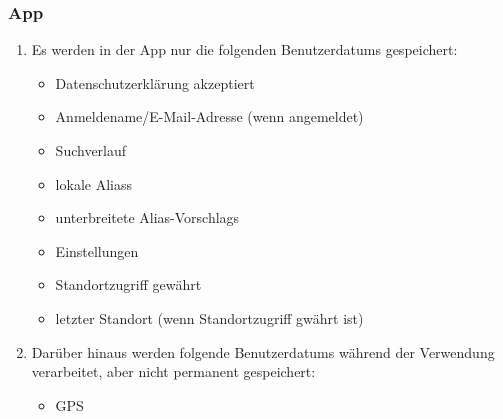 \subsubsection*{App}

\begin{samepage}
    \begin{enumerate}[label=\textbf{/NFD\arabic*0/}, align=left]
        \item Es werden in der App nur die folgenden \Glspl{Benutzerdatum} gespeichert:
            \begin{itemize}
                \item Datenschutzerklärung akzeptiert
                \item Anmeldename/E-Mail-Adresse (wenn angemeldet)
                \item Suchverlauf
                \item \gls{lokal}e \Glspl{Alias}
                \item unterbreitete \Glspl{Alias-Vorschlag}
                \item Einstellungen
                \item Standortzugriff gewährt
                \item letzter Standort (wenn Standortzugriff gwährt ist)
            \end{itemize}
            
        \item Darüber hinaus werden folgende \Glspl{Benutzerdatum} während der Verwendung verarbeitet, aber nicht permanent gespeichert:
            \begin{itemize}
                \item \Gls{GPS}
            \end{itemize}
    \end{enumerate}
\end{samepage}